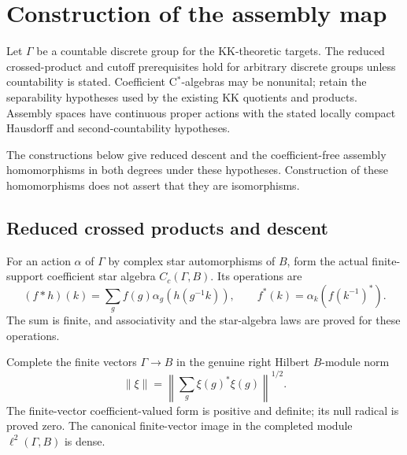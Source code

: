 \chapter{Construction of the assembly map}
\label{ch:assembly-map}

Let $\Gamma$ be a countable discrete group for the KK-theoretic targets.
The reduced crossed-product and cutoff prerequisites hold for arbitrary
discrete groups unless countability is stated. Coefficient C$^*$-algebras
may be nonunital; retain the separability hypotheses used by the existing KK
quotients and products. Assembly spaces have continuous proper actions with
the stated locally compact Hausdorff and second-countability hypotheses.

The constructions below give reduced descent and the coefficient-free
assembly homomorphisms in both degrees under these hypotheses. Construction
of these homomorphisms does not assert that they are isomorphisms.


\section{Reduced crossed products and descent}
\begin{definition}\label{def:algebraic-crossed-product}
\leanok
For an action $\alpha$ of $\Gamma$ by complex star automorphisms of $B$,
form the actual finite-support coefficient star algebra $C_c(\Gamma,B)$.
Its operations are
\[
 (f*h)(k)=\sum_g f(g)\alpha_g(h(g^{-1}k)),\qquad
 f^*(k)=\alpha_k(f(k^{-1})^*).
\]
The sum is finite, and associativity and the star-algebra laws are proved
for these operations.
\end{definition}

\begin{definition}\label{def:regular-crossed-hilbert-module}
\leanok
Complete the finite vectors $\Gamma\to B$ in the genuine right Hilbert
$B$-module norm
\[
 \|\xi\|=\left\|\sum_g\xi(g)^*\xi(g)\right\|^{1/2}.
\]
The finite-vector coefficient-valued form is positive and definite; its
null radical is proved zero. The canonical finite-vector image in the
completed module $\ell^2(\Gamma,B)$ is dense.
\end{definition}

